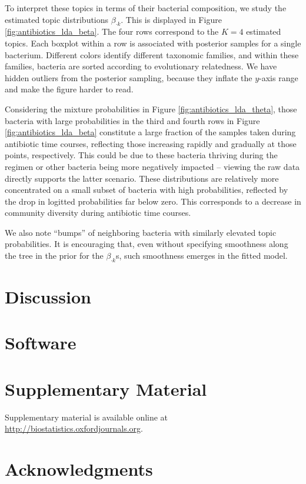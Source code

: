 \documentclass[oupdraft]{bio}
\begin{document}
To interpret these topics in terms of their bacterial composition, we study the
estimated topic distributions $\beta_{\cdot k}$. This is displayed in Figure
\ref{fig:antibiotics_lda_beta}. The four rows correspond to the $K = 4$
estimated topics. Each boxplot within a row is associated with posterior samples
for a single bacterium. Different colors identify different taxonomic families,
and within these families, bacteria are sorted according to evolutionary
relatedness. We have hidden outliers from the posterior sampling, because they
inflate the $y$-axis range and make the figure harder to read.

Considering the mixture probabilities in Figure \ref{fig:antibiotics_lda_theta},
those bacteria with large probabilities in the third and fourth rows in Figure
\ref{fig:antibiotics_lda_beta} constitute a large fraction of the samples taken
during antibiotic time courses, reflecting those increasing rapidly and
gradually at those points, respectively. This could be due to these bacteria
thriving during the regimen or other bacteria being more negatively impacted --
viewing the raw data directly supports the latter scenario. These distributions
are relatively more concentrated on a small subset of bacteria with high
probabilities, reflected by the drop in logitted probabilities far below zero.
This corresponds to a decrease in community diversity during antibiotic time
courses.

We also note ``bumps'' of neighboring bacteria with similarly elevated topic
probabilities. It is encouraging that, even without specifying smoothness along
the tree in the prior for the $\beta_{\cdot k}$s, such smoothness emerges in the
fitted model.

\section{Discussion}


\section{Software}

\section{Supplementary Material}

Supplementary material is available online at
\url{http://biostatistics.oxfordjournals.org}.

\section*{Acknowledgments}
\end{document}
